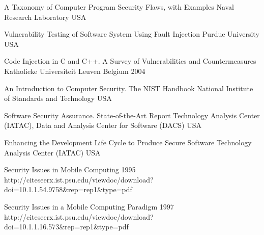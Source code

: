 \begin{thebibliography}{9}

		{
			\BibAnd
			\BibAnd
			\BibAnd
			}
		{A Taxonomy of Computer Program Security Flaws, with Examples}
		{Naval Research Laboratory}
		{USA}
		{}
		
		{
			\BibAnd
			}
		{Vulnerability Testing of Software System Using Fault Injection}
		{Purdue University}
		{USA}
		{}

		{
			\BibAnd
			\BibAnd
			}
		{Code Injection in {C} and {C++}. A Survey of Vulnerabilities and Countermeasures}
		{Katholieke Universiteit Leuven}
		{Belgium}
		{2004}
		
		{}
		{An Introduction to Computer Security. The {NIST} Handbook}
		{National Institute of Standards and Technology}
		{USA}
		{}

		{
			\BibAnd
			}
		{Software Security Assurance. State-of-the-Art Report}
		{Technology Analysis Center (IATAC), Data and Analysis Center for Software (DACS)}
		{USA}
		{}
	
		{
			\BibAnd
			}
		{Enhancing the Development Life Cycle to Produce Secure Software}
		{Technology Analysis Center (IATAC)}
		{USA}
		{}



		{}
		{Security Issues in Mobile Computing}	
		{1995}	
		{http://citeseerx.ist.psu.edu/viewdoc/download?doi=10.1.1.54.9758\&rep=rep1\&type=pdf}
		
		{
			\BibAnd
			}
		{Security Issues in a Mobile Computing Paradigm}	
		{1997}	
		{http://citeseerx.ist.psu.edu/viewdoc/download?doi=10.1.1.16.573\&rep=rep1\&type=pdf}
	

\end{thebibliography}
